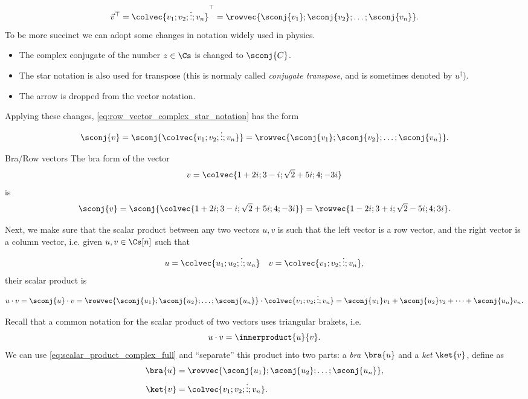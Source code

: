 \begin{equation}
	\vec{v}^{\top} = \colvec{v_{1};v_{2};\vdots;v_{n}}^{\top} = \rowvec{\sconj{v_{1}};\sconj{v_{2}};\dots;\sconj{v_{n}}}.
	\label{eq:row_vector_complex_star_notation}
\end{equation}
  To be more succinct we can adopt some changes in notation widely used in physics. 
\begin{itemize}
	\item The complex conjugate of the number $z\in\Cs$ is changed to $\sconj{C}$.
	\item The star notation is also used for transpose (this is normaly called \emph{conjugate transpose}, and is sometimes denoted by $u^{\dagger}$).
	\item The arrow is dropped from the vector notation.
\end{itemize}
Applying these changes, \autoref{eq:row_vector_complex_star_notation} has the form
\begin{equation}
	\sconj{v} = \sconj{\colvec{v_{1};v_{2};\vdots;v_{n}}} = \rowvec{\sconj{v_{1}};\sconj{v_{2}};\dots;\sconj{v_{n}}}.
	\label{eq:row_vector_complex_star_notation_transpose}
\end{equation}

\begin{example}{Bra/Row vectors}{}
	The bra form of the vector
	\[
		v = \colvec{1+2i;3-i;\sqrt{2}+5i;4;-3i}
	\]
	is
	\[
		\sconj{v} = \sconj{\colvec{1+2i;3-i;\sqrt{2}+5i;4;-3i}} = \rowvec{1-2i;3+i;\sqrt{2}-5i;4;3i}.
	\]
\end{example}

Next, we make sure that the scalar product between any two vectors $u,v$ is such that the left vector is a row vector, and the right vector is a column vector, i.e. given $u,v\in\Cs[n]$ such that
\[
	u = \colvec{u_{1};u_{2};\vdots;u_{n}} \quad v = \colvec{v_{1};v_{2};\vdots;v_{n}},
\]
their scalar product is
\begin{equation}
	u\cdot v = \sconj{u}\cdot v = \rowvec{\sconj{u_{1}};\sconj{u_{2}};\dots;\sconj{u_{n}}} \cdot \colvec{v_{1};v_{2};\vdots;v_{n}} = \sconj{u_{1}}v_{1} + \sconj{u_{2}}v_{2} + \cdots + \sconj{u_{n}}v_{n}.
	\label{eq:scalar_product_complex_full}
\end{equation}

Recall that a common notation for the scalar product of two vectors uses triangular brakets, i.e.
\[
	u\cdot v = \innerproduct{u}{v}.
\]
We can use \autoref{eq:scalar_product_complex_full} and ``separate'' this product into two parts: a \emph{bra} $\bra{u}$ and a \emph{ket} $\ket{v}$, define as
\begin{align}
	\bra{u} &= \rowvec{\sconj{u_{1}};\sconj{u_{2}};\dots;\sconj{u_{n}}},\nonumber\\
	\ket{v} &= \colvec{v_{1};v_{2};\vdots;v_{n}}.
	\label{eq:bra_ket_def}
\end{align}

